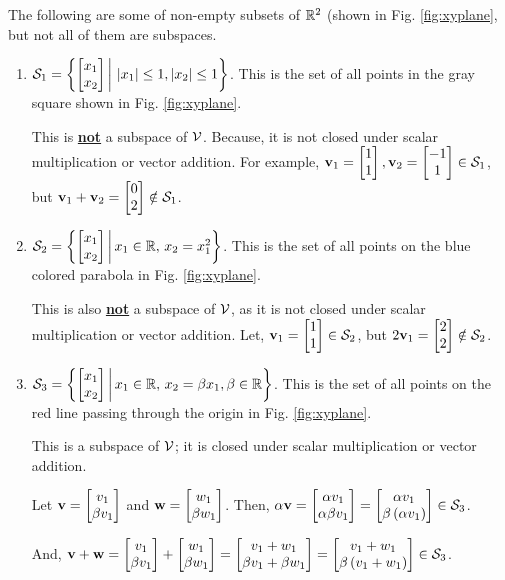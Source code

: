 The following are some of non-empty subsets of $\mathbb{R}^2$ (shown in Fig. \ref{fig:xyplane}, but not all of them are subspaces. 
\begin{enumerate}
    \item $\mc{S}_1 = \lc \bmxc x_1\\ x_2 \emx \bigg\vert \, \lv x_1 \rv \leq 1, \lv x_2 \rv \leq 1\rc$. This is the set of all points in the gray square shown in Fig. \ref{fig:xyplane}.

    This is \textbf{\underline{not}} a subspace of $\mathcal{V}$. Because, it is not closed under scalar multiplication or vector addition. For example, $\mf{v}_1 =  \bmxc 1 \\ 1\emx, \mf{v}_2 = \bmxc -1 \\ 1\emx \in \mc{S}_1$, but $\mf{v}_1 + \mf{v}_2 = \bmxc 0 \\ 2\emx \notin \mc{S}_1$.

    \item $\mc{S}_2 = \lc \bmxc x_1\\ x_2 \emx \bigg\vert \, x_1 \in \mb{R}, \, x_2 = x_1^2 \rc$. This is the set of all points on the blue colored parabola in Fig. \ref{fig:xyplane}.

    This is also \textbf{\underline{not}} a subspace of $\mathcal{V}$, as it is not closed under scalar multiplication or vector addition. Let, $\mf{v}_1 =  \bmxc 1 \\ 1\emx \in \mc{S}_2$, but $2\mf{v}_1 = \bmxc 2 \\ 2\emx \notin \mc{S}_2$.

    \item $\mc{S}_3 = \lc \bmxc x_1\\ x_2 \emx \bigg\vert \, x_1 \in \mb{R}, \, x_2 = \beta x_1, \beta \in \mb{R} \rc$. This is the set of all points on the red line passing through the origin in Fig. \ref{fig:xyplane}.

    This is a subspace of $\mathcal{V}$; it is closed under scalar multiplication or vector addition. 

    Let $\mf{v} = \bmxc v_1 \\ \beta v_1\emx$ and $\mf{w} = \bmxc w_1 \\ \beta w_1\emx$. Then, $\alpha \mf{v} = \bmxc \alpha v_1 \\ \alpha \beta v_1\emx = \bmxc \alpha v_1 \\ \beta \lp \alpha v_1 \rp\emx \in \mc{S}_3$.

    And, $\mf{v} + \mf{w} = \bmxc v_1 \\ \beta v_1\emx + \bmxc w_1 \\ \beta w_1\emx = \bmxc v_1 + w_1\\ \beta v_1 + \beta w_1\emx = \bmxc v_1 + w_1\\ \beta \lp v_1 + w_1 \rp\emx \in \mc{S}_3$.
\end{enumerate}

